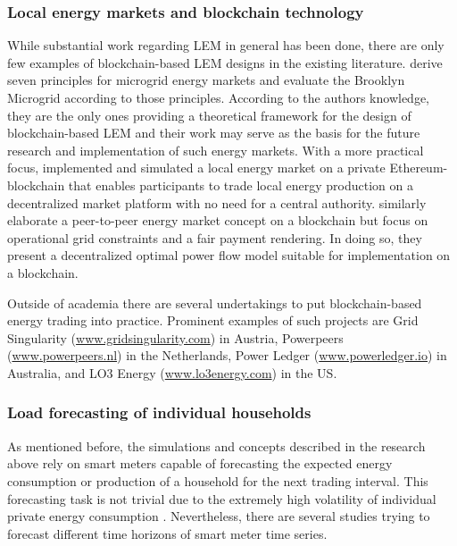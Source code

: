\subsubsection{Local energy markets and blockchain technology}

While substantial work regarding LEM in general has been done, there are only few examples of blockchain-based LEM designs in the existing literature. \citet{Mengelkamp:2018b} derive seven principles for microgrid energy markets and evaluate the Brooklyn Microgrid according to those principles. According to the authors knowledge, they are the only ones providing a theoretical framework for the design of blockchain-based LEM and their work may serve as the basis for the future research and implementation of such energy markets. With a more practical focus, \citet{Mengelkamp:2018a} implemented and simulated a local energy market on a private Ethereum-blockchain  that enables participants to trade local energy production on a decentralized market platform with no need for a central authority. \citet{Münsing:2017} similarly elaborate a peer-to-peer energy market concept on a blockchain but focus on operational grid constraints and a fair payment rendering. In doing so, they present a decentralized optimal power flow model suitable for implementation on a blockchain.

Outside of academia there are several undertakings to put blockchain-based energy trading into practice. Prominent examples of such projects are Grid Singularity (\url{www.gridsingularity.com}) in Austria, Powerpeers (\url{www.powerpeers.nl}) in the Netherlands, Power Ledger (\url{www.powerledger.io}) in Australia, and LO3 Energy (\url{www.lo3energy.com}) in the US.



\subsubsection{Load forecasting of individual households}

As mentioned before, the simulations and concepts described in the research above rely on smart meters capable of forecasting the expected energy consumption or production of a household for the next trading interval. This forecasting task is not trivial due to the extremely high volatility of individual private energy consumption \citep{Wang:2018}. Nevertheless, there are several studies trying to forecast different time horizons of smart meter time series.

